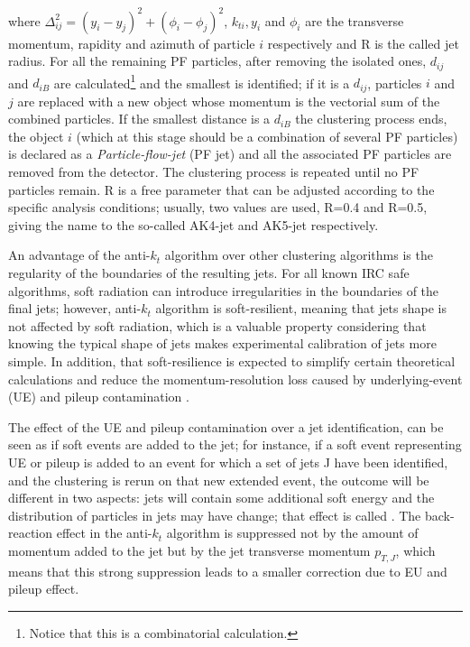 \noindent where $\Delta_{ij}^2=(y_i-y_j)^2 + (\phi_i-\phi_j)^2$, $k_{ti}, y_i$ and $\phi_i$ are the transverse momentum, rapidity and azimuth of particle $i$ respectively and R is the called jet radius. For all the remaining PF particles, after removing the isolated ones, $d_{ij}$ and $d_{iB}$ are calculated\footnote{Notice that this is a combinatorial calculation.} and the smallest is identified; if it is a $d_{ij}$, particles $i$ and $j$ are replaced with a new object whose momentum is the vectorial sum of the combined particles. If the smallest distance is a $d_{iB}$ the clustering process ends, the object $i$ (which at this stage should be a combination of several PF particles) is declared as a \textit{Particle-flow-jet} (PF jet) and all the associated PF particles are removed from the detector. The clustering process is repeated until no PF particles remain. R is a free parameter that can be adjusted according to the specific analysis conditions; usually, two values are used, R=0.4 and R=0.5, giving the name to the so-called AK4-jet and AK5-jet respectively.     

An advantage of the anti-$k_t$ algorithm over other clustering algorithms is the regularity of the boundaries of the resulting jets. For all known IRC safe algorithms, soft radiation can introduce irregularities in the boundaries of the final jets; however, anti-$k_t$ algorithm is soft-resilient, meaning that jets shape is not affected by soft radiation, which is a valuable property considering that knowing the typical shape of jets makes experimental calibration of jets more simple. In addition, that soft-resilience is expected to simplify certain theoretical calculations and reduce the momentum-resolution loss caused by underlying-event (UE) and pileup contamination \cite{antikt}.  

The effect of the UE and pileup contamination over a jet identification, can be seen as if soft events are added to the jet; for instance, if a soft event representing UE or pileup is added to an event for which a set of jets J have been identified, and the clustering is rerun on that new extended event, the outcome will be different in two aspects: jets will contain some additional soft energy and the distribution of particles in jets may have change; that effect is called . The back-reaction effect in the anti-$k_t$ algorithm is suppressed not by the amount of momentum added to the jet but by the jet transverse momentum $p_{T,J}$, which means that this strong suppression leads to a smaller correction due to EU and pileup effect\cite{antikt}.               


